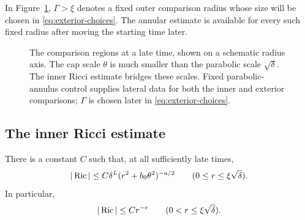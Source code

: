 In Figure~\ref{fig:scales}, \(\Gamma>\xi\) denotes a fixed outer
comparison radius whose size will be chosen in
\eqref{eq:exterior-choices}. The annular estimate is available for
every such fixed radius after moving the starting time later.

\begin{figure}[htbp]
\centering

\caption{The comparison regions at a late time, shown on a schematic
radius axis. The cap scale \(\theta\) is much smaller than the
parabolic scale \(\sqrt\delta\). The inner Ricci estimate bridges these
scales. Fixed parabolic-annulus control supplies lateral data for both
the inner and exterior comparisons; \(\Gamma\) is chosen later in
\eqref{eq:exterior-choices}.}
\label{fig:scales}
\end{figure}

\subsection{The inner Ricci estimate}

\begin{proposition}\label{prop:ricci-barrier}
There is a constant \(C\) such that, at all sufficiently late times,
\begin{equation}\label{eq:inner-ricci}
|\operatorname{Ric}|\le C\delta^L(r^2+b_0\theta^2)^{-a/2}
\qquad(0\le r\le\xi\sqrt\delta).
\end{equation}
In particular,
\begin{equation}\label{eq:ricci-power}
|\operatorname{Ric}|\le Cr^{-e}\qquad(0<r\le\xi\sqrt\delta).
\end{equation}
\end{proposition}

